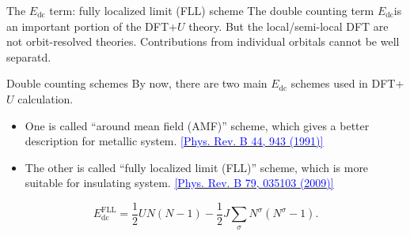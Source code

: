 \documentclass{beamer}
\begin{document}
  \begin{frame}{The \(E_\text{dc}\) term: fully localized limit (FLL) scheme}
    The double counting term \(E_\text{dc}\)is an important portion of the DFT+\(U\) theory. But the local/semi-local DFT are not orbit-resolved theories. Contributions from individual orbitals cannot be well separatd.

    \begin{block}{Double counting schemes}
      By now, there are two main \(E_\text{dc}\) schemes used in DFT+\(U\) calculation. 
      \begin{itemize}
        \item One is called ``around mean field (AMF)'' scheme, which gives a better description for metallic system. \href{https://doi.org/10.1103/physrevb.44.943}{\textcolor{blue}{\tiny[Phys. Rev. B 44, 943 (1991)]}}
        \item The other is called ``fully localized limit (FLL)'' scheme, which is more suitable for insulating system. \href{https://doi.org/10.1103/PhysRevB.79.035103}{\textcolor{blue}{\tiny[Phys. Rev. B 79, 035103 (2009)]}}
      \end{itemize}
    \end{block}
    \begin{equation}
      E_\text{dc}^{\text{FLL}} = \frac{1}{2}UN(N-1) - \frac{1}{2}J\sum_\sigma{}N^\sigma(N^\sigma{}-1).
    \end{equation}
  \end{frame}
\end{document}
